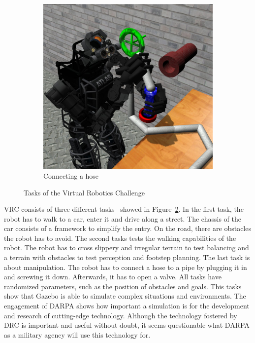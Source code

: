 \begin{figure}
\begin{subfigure}[b]{0.3\textwidth}
    \includegraphics[width=\textwidth]{pics/darpa_hose}
    \caption{Connecting a hose}
    \label{fig:vrc_hose}
  \end{subfigure}
  \caption{Tasks of the Virtual Robotics Challenge~\cite{vrc_pics}}
  \label{fig:vrc}
\end{figure}
VRC consists of three different tasks~\cite{vrc_rules} showed in Figure~\ref{fig:vrc}. In the first task, the robot has to walk to a car, enter it and drive along a street. The chassis of the car consists of a framework to simplify the entry. On the road, there are obstacles the robot has to avoid. The second tasks tests the walking capabilities of the robot. The robot has to cross slippery and irregular terrain to test balancing and a terrain with obstacles to test perception and footstep planning. The last task is about manipulation. The robot has to connect a hose to a pipe by plugging it in and screwing it down. Afterwards, it has to open a valve. All tasks have randomized parameters, such as the position of obstacles and goals. This tasks show that Gazebo is able to simulate complex situations and environments. The engagement of DARPA shows how important a simulation is for the development and research of cutting-edge technology. Although the technology fostered by DRC is important and useful without doubt, it seems questionable what DARPA as a military agency will use this technology for.


